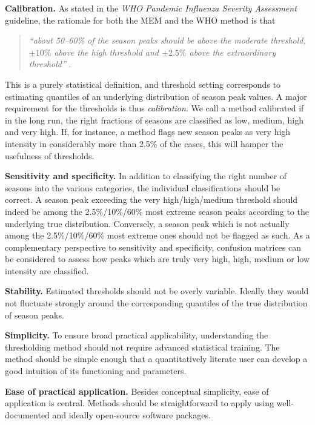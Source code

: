 \documentclass{article}
\begin{document}
\begin{description}
\item \textbf{Calibration.} As stated in the \textit{WHO Pandemic Influenza Severity Assessment} guideline, the rationale for both the MEM and the WHO method is that
\begin{quote}
\textit{``about 50--60\% of the season peaks should be above the moderate threshold, $\pm 10\%$ above the high threshold and $\pm 2.5\%$ above the extraordinary threshold''} \citep[p.10]{WHO2017}.
\end{quote}
This is a purely statistical definition, and threshold setting corresponds to estimating quantiles of an underlying distribution of season peak values. A major requirement for the thresholds is thus \textit{calibration}. We call a method calibrated if in the long run, the right fractions of seasons are classified as low, medium, high and very high. If, for instance, a method flags new season peaks as very high intensity in considerably more than 2.5\% of the cases, this will hamper the usefulness of thresholds.
\item \textbf{Sensitivity and specificity.} In addition to classifying the right number of seasons into the various categories, the individual classifications should be correct. A season peak exceeding the very high/high/medium threshold should indeed be among the 2.5\%/10\%/60\% most extreme season peaks according to the underlying true distribution. Conversely, a season peak which is not actually among the 2.5\%/10\%/60\% most extreme ones should not be flagged as such. As a complementary perspective to sensitivity and specificity, confusion matrices can be considered to assess how peaks which are truly very high, high, medium or low intensity are classified. %
\item \textbf{Stability.} Estimated thresholds should not be overly variable. Ideally they would not fluctuate strongly around the corresponding quantiles of the true distribution of season peaks.
\item \textbf{Simplicity.} To ensure broad practical applicability, understanding the thresholding method should not require advanced statistical training. The method should be simple enough that a quantitatively literate user can develop a good intuition of its functioning and parameters.
\item \textbf{Ease of practical application.} Besides conceptual simplicity, ease of application is central. Methods should be straightforward to apply using well-documented and ideally open-source software packages.
\end{description}
\end{document}
